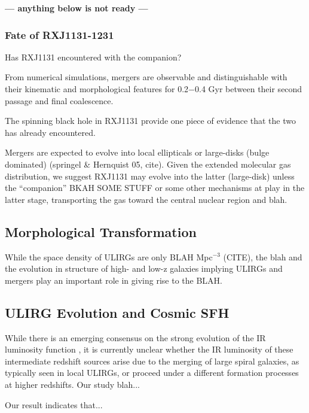 \documentclass[]{emulateapj}
\begin{document}
{\bf --- anything below is not ready ---}
\subsubsection{Fate of RXJ1131-1231}
Has RXJ1131 encountered with the companion?

From numerical simulations, mergers are observable and distinguishable
with their kinematic and morphological features for 0.2$-$0.4 Gyr
between their second passage and final coalescence.

The spinning black hole in RXJ1131 provide one piece of
evidence that the two has already encountered.


Mergers are expected to evolve into
local ellipticals or large-disks (bulge dominated) (springel \& Hernquist 05, cite).
Given the
extended molecular gas distribution, we suggest RXJ1131 may evolve into the
latter (large-disk) unless the ``companion'' BKAH SOME STUFF or some other
mechanisms at play in the latter stage, transporting the gas
toward the central nuclear region and blah.

\subsection{Morphological Transformation}
While the space density of ULIRGs are only BLAH Mpc$^{-3}$ (CITE), 
the blah and the evolution in structure of high- and low-z galaxies
implying ULIRGs and mergers play an important role in giving rise to the BLAH.


\subsection{ULIRG Evolution and Cosmic SFH}
While there is an emerging consensus on the strong
evolution of the IR luminosity function \citep[\eg][]{Huynh07a,Seymour10a},
it is currently unclear whether the IR luminosity of
these intermediate redshift sources arise due to the merging of large spiral
galaxies, as typically seen in local ULIRGs, or proceed under a different
formation processes at higher redshifts. Our study blah...

Our result indicates that...
\end{document}

